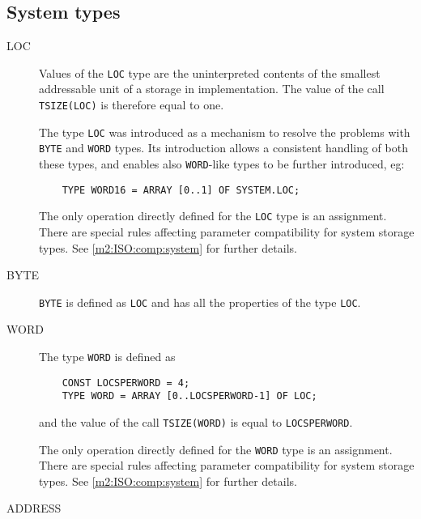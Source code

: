 \subsection{System types}\label{m2:system:types}

\begin{description}
\item[LOC] \mbox{}  

        Values  of the {\tt LOC} type are the uninterpreted contents of
        the   smallest   addressable  unit  of  a  storage  in
        implementation. The value of the call {\tt TSIZE(LOC)} is
        therefore equal to one.

        The  type  {\tt LOC}  was  introduced as a mechanism to resolve
        the problems  with  {\tt  BYTE}  and  {\tt  WORD}  types. Its
        introduction  allows  a consistent handling of both these
        types,  and enables also {\tt WORD}-like types to
        be further introduced, eg:

\verb'    TYPE WORD16 = ARRAY [0..1] OF SYSTEM.LOC;'

        The only operation directly defined for the {\tt LOC} type is
        an assignment. There are special rules affecting parameter
        compatibility for system storage types. See
        \ref{m2:ISO:comp:system} for further details.

\item[BYTE] \mbox{}  

        {\tt BYTE}  is defined as {\tt LOC} and has all the properties of the
        type {\tt LOC}.

\item[WORD] \mbox{} 

        The type {\tt WORD} is defined as

\verb'    CONST LOCSPERWORD = 4;'\\
\verb'    TYPE WORD = ARRAY [0..LOCSPERWORD-1] OF LOC;'

        and the value of the call {\tt TSIZE(WORD)} is equal to
        {\tt LOCSPERWORD}.

        The  only  operation  directly defined for the {\tt WORD}
        type is an assignment.  There  are special rules affecting
        parameter compatibility    for    system    storage
        types.   See \ref{m2:ISO:comp:system} for further details.

\item[ADDRESS] \mbox{} 


\end{description}
